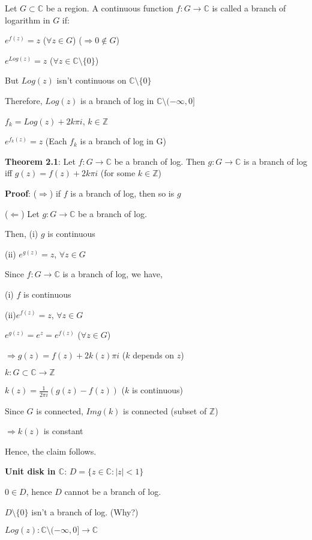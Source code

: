 \documentclass{article}
\begin{document}
\begin{flushleft}
Let $G\subset \mathds{C}$ be a region. A continuous function $f:G\rightarrow \mathds{C}$ is called a branch of logarithm in $G$ if:

$e^{f(z)}=z$ ($\forall z\in G$) ($\Rightarrow 0\notin G$)

$e^{Log(z)}=z$ ($\forall z\in \mathds{C}\setminus \{0\}$)

But $Log(z)$ isn't continuous on $\mathds{C}\setminus\{0\}$

Therefore, $Log(z)$ is a branch of log in $\mathds{C}\setminus (-\infty,0]$ 

$f_k=Log(z)+2k\pi i$, $k\in \mathds{Z}$

$e^{f_k(z)}=z$ (Each $f_k$ is a branch of log in G)

\textbf{Theorem 2.1}: Let $f:G\rightarrow \mathds{C}$ be a branch of log. Then $g:G\rightarrow \mathds{C}$ is a branch of log iff $g(z)=f(z)+2k\pi i$ (for some $k\in \mathds{Z}$)

\textbf{Proof}: ($\Rightarrow$) if $f$ is a branch of log, then so is $g$

($\Leftarrow$) Let $g:G\rightarrow \mathds{C}$ be a branch of log. 

Then, (i) $g$ is continuous

(ii) $e^{g(z)}=z$, $\forall z\in G$

Since $f:G\rightarrow \mathds{C}$ is a branch of log, we have, 

(i) $f$ is continuous 

(ii)$e^{f(z)}=z$, $\forall z\in G$

$e^{g(z)}=e^z=e^{f(z)}$ ($\forall z\in G$)

$\Rightarrow g(z)=f(z)+ 2k(z)\pi i$ ($k$ depends on $z$)

$k: G\subset \mathds{C}\rightarrow \mathds{Z}$

$k(z)=\frac{1}{2\pi i}(g(z)-f(z))$ ($k$ is continuous)

Since $G$ is connected, $Img(k)$ is connected  (subset of $\mathds{Z}$)

$\Rightarrow k(z)$ is constant 

Hence, the claim follows.

\textbf{Unit disk in $\mathds{C}$}: $D=\{z\in \mathds{C}: |z|< 1\}$

$0\in D$, hence $D$ cannot be a branch of log. 

$D\setminus \{0\}$ isn't a branch of log. (Why?)

$Log(z): \mathds{C}\setminus (-\infty,0]\rightarrow \mathds{C}$


\end{flushleft}
\end{document}
